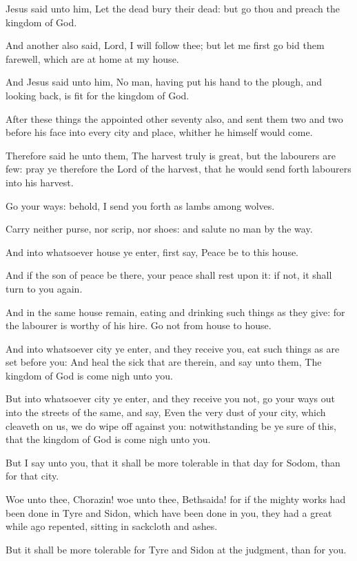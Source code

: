 \Verse Jesus said unto him, Let the dead bury their dead: but go thou and preach the kingdom of God.

\Verse And another also said, Lord, I will follow thee; but let me first go bid them farewell, which are at home at my house.

\Verse And Jesus said unto him, No man, having put his hand to the plough, and looking back, is fit for the kingdom of God.


\Chapter
\Verse After these things the \LORD appointed other seventy also, and sent them two and two before his face into every city and place, whither he himself would come.

\Verse Therefore said he unto them, The harvest truly is great, but the labourers are few: pray ye therefore the Lord of the harvest, that he would send forth labourers into his harvest.

\Verse Go your ways: behold, I send you forth as lambs among wolves.

\Verse Carry neither purse, nor scrip, nor shoes: and salute no man by the way.

\Verse And into whatsoever house ye enter, first say, Peace be to this house.

\Verse And if the son of peace be there, your peace shall rest upon it: if not, it shall turn to you again.

\Verse And in the same house remain, eating and drinking such things as they give: for the labourer is worthy of his hire. Go not from house to house.

\Verse And into whatsoever city ye enter, and they receive you, eat such things as are set before you: \Verse And heal the sick that are therein, and say unto them, The kingdom of God is come nigh unto you.

\Verse But into whatsoever city ye enter, and they receive you not, go your ways out into the streets of the same, and say, \Verse Even the very dust of your city, which cleaveth on us, we do wipe off against you: notwithstanding be ye sure of this, that the kingdom of God is come nigh unto you.

\Verse But I say unto you, that it shall be more tolerable in that day for Sodom, than for that city.

\Verse Woe unto thee, Chorazin! woe unto thee, Bethsaida! for if the mighty works had been done in Tyre and Sidon, which have been done in you, they had a great while ago repented, sitting in sackcloth and ashes.

\Verse But it shall be more tolerable for Tyre and Sidon at the judgment, than for you.

